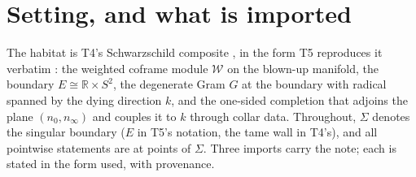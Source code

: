 \documentclass[11pt]{article}
\theoremstyle{definition}
\theoremstyle{plain}
\providecommand{\R}{}\renewcommand{\R}{\mathbb{R}}
\providecommand{\Sig}{}\renewcommand{\Sig}{\Sigma}
\providecommand{\nInf}{}\renewcommand{\nInf}{n_\infty}
\providecommand{\nO}{}\renewcommand{\nO}{n_0}
\providecommand{\shW}{}\renewcommand{\shW}{\mathcal{W}}
\begin{document}
\noindent{}
\newpage

\section{Setting, and what is imported}

\label{c:note.three-routes.setting-setting-what-imported}
The habitat is T4's Schwarzschild composite \cite{ButlerT4}, in the form T5 reproduces it verbatim \cite{ButlerT5}: the weighted coframe module $\shW$ on the blown-up manifold, the boundary $E \cong \R \times S^2$, the degenerate Gram $G$ at the boundary with radical spanned by the dying direction $k$, and the one-sided completion that adjoins the plane $(\nO, \nInf)$ and couples it to $k$ through collar data. Throughout, $\Sig$ denotes the singular boundary ($E$ in T5's notation, the tame wall in T4's), and all pointwise statements are at points of $\Sig$. Three imports carry the note; each is stated in the form used, with provenance.
\end{document}
